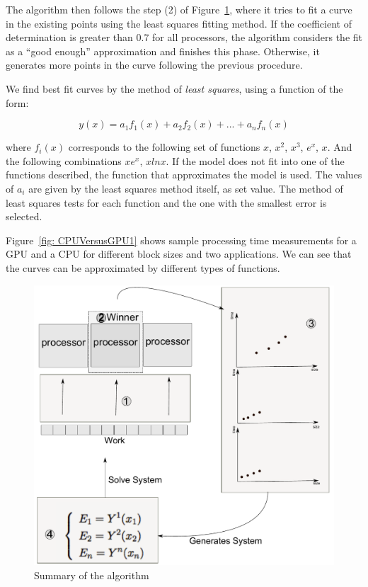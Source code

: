 \documentclass[journal]{IEEEtran}
\begin{document}
The algorithm then follows the step (2) of Figure~\ref{fig: algoritmo}, where it
tries to fit a curve in the existing points using the least squares fitting
method. If the coefficient of determination is greater than 0.7 for all
processors, the algorithm considers the fit as a ``good enough'' approximation and finishes this
phase. Otherwise, it generates more points in the curve following the previous
procedure.
 

We find best fit curves by the method of \textit{least squares}, using a
function of the form:

\begin{equation}
 y(x) = a_{1} f_{1}(x) +  a_{2} f_{2}(x) + ... + a_{n} f_{n}(x) 
\label{eq: least}
\end{equation} 

where $ f_i (x) $ corresponds to the following set of functions $x$, $x^2$, $x^3$,  $e^x$, $x$. And the following combinations $xe^x$, $xlnx$. If the model does not fit into one of the functions described, the function that approximates the model is used. The values ​​of $a_i$ are given by the least squares method itself, as set value. The method of least squares tests for each function and the one with the smallest error is selected.

Figure~\ref{fig: CPUVersusGPU1} shows sample processing time measurements for a
GPU and a CPU for different block sizes and two applications. We can see that
the curves can be approximated by different types of functions.

\begin{figure}[!t]
	\centering
	\includegraphics[scale=0.33]{diagramaAlgoritmo.pdf} 
	\caption{Summary of the algorithm}
	\label{fig: algoritmo}
\end{figure}
\end{document}
